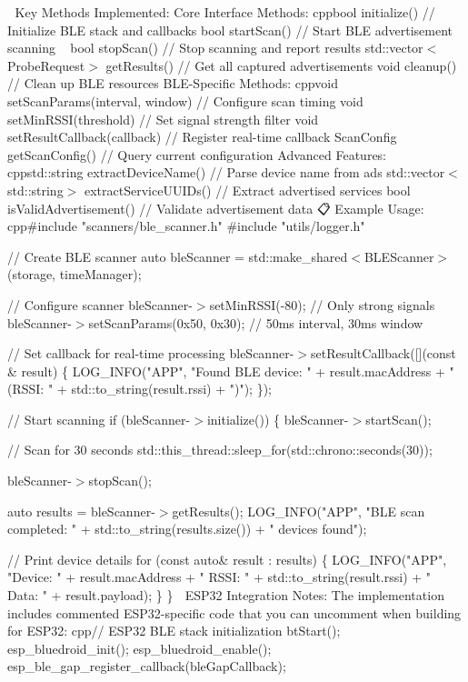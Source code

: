 🎯 Key Methods Implemented\+: Core Interface Methods\+: cppbool initialize() // Initialize BLE stack and callbacks bool start\+Scan() // Start BLE advertisement scanning ~\newline
 bool stop\+Scan() // Stop scanning and report results std\+::vector$<$\+Probe\+Request$>$ get\+Results() // Get all captured advertisements void cleanup() // Clean up BLE resources BLE-\/\+Specific Methods\+: cppvoid set\+Scan\+Params(interval, window) // Configure scan timing void set\+Min\+RSSI(threshold) // Set signal strength filter void set\+Result\+Callback(callback) // Register real-\/time callback Scan\+Config get\+Scan\+Config() // Query current configuration Advanced Features\+: cppstd\+::string extract\+Device\+Name() // Parse device name from ads std\+::vector$<$std\+::string$>$ extract\+Service\+UUIDs() // Extract advertised services bool is\+Valid\+Advertisement() // Validate advertisement data 📋 Example Usage\+: cpp\#include "{}scanners/ble\+\_\+scanner.\+h"{} \#include "{}utils/logger.\+h"{}

// Create BLE scanner auto ble\+Scanner = std\+::make\+\_\+shared$<$\+BLEScanner$>$(storage, time\+Manager);

// Configure scanner ble\+Scanner-\/\texorpdfstring{$>$}{>}set\+Min\+RSSI(-\/80); // Only strong signals ble\+Scanner-\/\texorpdfstring{$>$}{>}set\+Scan\+Params(0x50, 0x30); // 50ms interval, 30ms window

// Set callback for real-\/time processing ble\+Scanner-\/\texorpdfstring{$>$}{>}set\+Result\+Callback(\mbox{[}\mbox{]}(const \& result) \{ LOG\+\_\+\+INFO("{}\+APP"{}, "{}\+Found BLE device\+: "{} + result.\+mac\+Address + "{} (\+RSSI\+: "{} + std\+::to\+\_\+string(result.\+rssi) + "{})"{}); \});

// Start scanning if (ble\+Scanner-\/\texorpdfstring{$>$}{>}initialize()) \{ ble\+Scanner-\/\texorpdfstring{$>$}{>}start\+Scan();

// Scan for 30 seconds std\+::this\+\_\+thread\+::sleep\+\_\+for(std\+::chrono\+::seconds(30));

ble\+Scanner-\/\texorpdfstring{$>$}{>}stop\+Scan();

auto results = ble\+Scanner-\/\texorpdfstring{$>$}{>}get\+Results(); LOG\+\_\+\+INFO("{}\+APP"{}, "{}\+BLE scan completed\+: "{} + std\+::to\+\_\+string(results.\+size()) + "{} devices found"{});

// Print device details for (const auto\& result \+: results) \{ LOG\+\_\+\+INFO("{}\+APP"{}, "{}\+Device\+: "{} + result.\+mac\+Address + "{} RSSI\+: "{} + std\+::to\+\_\+string(result.\+rssi) + "{} Data\+: "{} + result.\+payload); \} \} 🔧 ESP32 Integration Notes\+: The implementation includes commented ESP32-\/specific code that you can uncomment when building for ESP32\+: cpp// ESP32 BLE stack initialization bt\+Start(); esp\+\_\+bluedroid\+\_\+init(); esp\+\_\+bluedroid\+\_\+enable(); esp\+\_\+ble\+\_\+gap\+\_\+register\+\_\+callback(ble\+Gap\+Callback);

